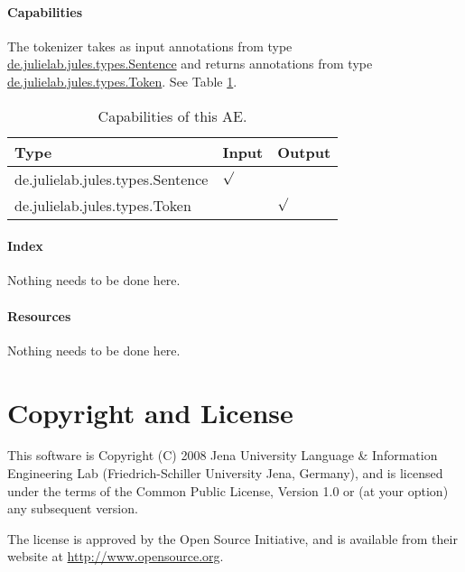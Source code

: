 \documentclass[11pt,a4paper,halfparskip]{scrartcl}
\begin{document}
\paragraph{Capabilities}
\label{sss:capabilities}
The tokenizer takes as input annotations from type \url{de.julielab.jules.types.Sentence} and returns annotations from type \url{de.julielab.jules.types.Token}. See Table \ref{tab:capabilities}.
\begin{table}[h!]
  \centering
  \begin{tabular}{|p{5cm}|p{2cm}|p{2cm}|}
    \hline
    Type & Input & Output \\
    \hline\hline
     de.julielab.jules.types.Sentence & $\surd$ & \\
      \hline
     de.julielab.jules.types.Token & &  $\surd$  \\
      \hline
  \end{tabular}
  \caption{Capabilities of this AE.}
  \label{tab:capabilities}
\end{table} 


\paragraph{Index}
Nothing needs to be done here.

\paragraph{Resources}
Nothing needs to be done here.


\section{Copyright and License}
This software is Copyright (C) 2008 Jena University Language \& Information
Engineering Lab (Friedrich-Schiller University Jena, Germany), and is
licensed under the terms of the Common Public License, Version 1.0 or (at
your option) any subsequent version.

The license is approved by the Open Source Initiative, and is
available from their website at \url{http://www.opensource.org}.



\end{document}
